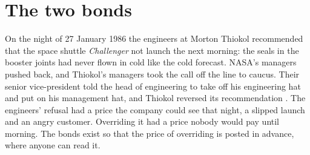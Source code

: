 \section{The two bonds}
\label{sec:13.6}
On the night of 27 January 1986 the engineers at Morton Thiokol recommended that the space shuttle \emph{Challenger} not launch the next morning: the seals in the booster joints had never flown in cold like the cold forecast. NASA's managers pushed back, and Thiokol's managers took the call off the line to caucus. Their senior vice-president told the head of engineering to take off his engineering hat and put on his management hat, and Thiokol reversed its recommendation \autocite{rogers1986report}. The engineers' refusal had a price the company could see that night, a slipped launch and an angry customer. Overriding it had a price nobody would pay until morning. The bonds exist so that the price of overriding is posted in advance, where anyone can read it.


